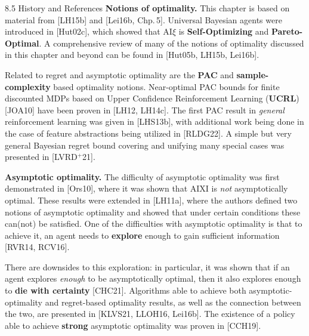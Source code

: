 \documentclass[aspectratio=169,10pt]{beamer}
\begin{document}
\begin{frame}[allowframebreaks]{8.5 History and References}
  \textbf{Notions of optimality.} This chapter is based on material from
  [LH15b] and [Lei16b, Chp.\,5]. Universal Bayesian agents were introduced
  in [Hut02c], which showed that $\mathrm{AI}\xi$ is
  \textbf{Self-Optimizing} and \textbf{Pareto-Optimal}. A comprehensive
  review of many of the notions of optimality discussed in this chapter and
  beyond can be found in [Hut05b, LH15b, Lei16b].

  \bigskip
  Related to regret and asymptotic optimality are the \textbf{PAC} and
  \textbf{sample-complexity} based optimality notions. Near-optimal PAC
  bounds for finite discounted MDPs based on Upper Confidence Reinforcement
  Learning (\textbf{UCRL}) [JOA10] have been proven in [LH12, LH14c]. The
  first PAC result in \emph{general} reinforcement learning was given in
  [LHS13b], with additional work being done in the case of feature
  abstractions being utilized in [RLDG22]. A simple but very general
  Bayesian regret bound covering and unifying many special cases was
  presented in [LVRD$^+$21].

  \framebreak

  \textbf{Asymptotic optimality.} The difficulty of asymptotic optimality
  was first demonstrated in [Ors10], where it was shown that AIXI is
  \emph{not} asymptotically optimal. These results were extended in
  [LH11a], where the authors defined two notions of asymptotic optimality
  and showed that under certain conditions these can(not) be satisfied. One
  of the difficulties with asymptotic optimality is that to achieve it, an
  agent needs to \textbf{explore} enough to gain sufficient information
  [RVR14, RCV16].

  \bigskip
  There are downsides to this exploration: in particular, it was shown that
  if an agent explores \emph{enough} to be asymptotically optimal, then it
  also explores enough to \textbf{die with certainty} [CHC21]. Algorithms
  able to achieve both asymptotic-optimality and regret-based optimality
  results, as well as the connection between the two, are presented in
  [KLVS21, LLOH16, Lei16b]. The existence of a policy able to achieve
  \textbf{strong} asymptotic optimality was proven in [CCH19].
\end{frame}
\end{document}
